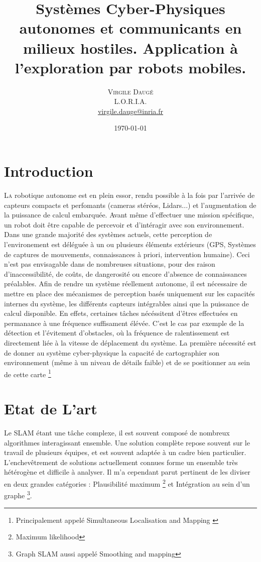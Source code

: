 \documentclass[twoside,twocolumn]{article}
\title{Systèmes Cyber-Physiques autonomes et communicants en milieux hostiles. Application à l’exploration par robots mobiles. } %
\author{%
\textsc{Virgile Daugé} \\[1ex] %
\normalsize L.O.R.I.A. \\ %
\normalsize \href{mailto:virgile.dauge@inria.fr}{virgile.dauge@inria.fr} %
}
\date{\today} %
\begin{document}
\maketitle


\section{Introduction}

\lettrine[nindent=0em,lines=3]{L}a robotique autonome est en plein essor, rendu possible à la fois
par l'arrivée de capteurs compacts et perfomants (cameras stéréos, Lidars...) et l'augmentation de la puissance de calcul embarquée.
Avant même d'effectuer une mission spécifique, un robot doit être capable de percevoir et d'intéragir avec son environnement.
Dans une grande majorité des systèmes actuels, cette perception de l'environement est déléguée à un ou plusieurs éléments extérieurs
(GPS, Systèmes de captures de mouvements, connaissances à priori, intervention humaine). Ceci n'est pas envisagable dans de nombreuses situations,
pour des raison d'inaccessibilité, de coûts, de dangerosité ou encore d'absence de connaissances préalables. Afin de rendre un système réellement autonome,
il est nécessaire de mettre en place des mécanismes de perception basés uniquement sur les capacités internes du système, les différents capteurs intégrables
ainsi que la puissance de calcul disponible. En effets, certaines tâches nécéssitent d'êtres effectuées en permanance à une fréquence suffisament élévée.
C'est le cas par exemple de la détection et l'évitement d'obstacles,
où la fréquence de ralentissement est directement liée à la vitesse de déplacement du système.
La première nécessité est de donner au système cyber-physique la capacité de cartographier son environnement
(même à un niveau de détails faible) et de se positionner au sein de cette carte
\footnote{Principalement appelé Simultaneous Localisation and Mapping \cite{durrant-whyte_simultaneous_2006}\cite{bailey_simultaneous_2006}}

\section{Etat de L'art}
Le SLAM étant une tâche complexe, il est souvent composé de nombreux algorithmes interagissant ensemble.
Une solution complète repose souvent sur le travail de plusieurs équipes, et est souvent adaptée à un cadre bien particulier.
L'enchevêtrement de solutions actuellement connues forme un ensemble très hétérogène et difficile à analyser.
Il m'a cependant parut pertinent de les diviser en deux grandes catégories : Plausibilité maximum \footnote{Maximum likelihood}
et Intégration au sein d'un graphe \footnote{Graph SLAM aussi appelé Smoothing and mapping}.
\end{document}
